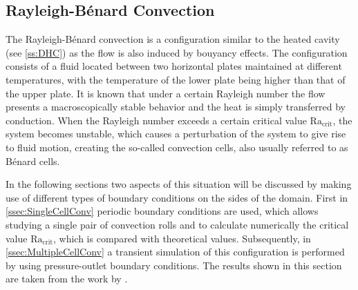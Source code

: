 \subsection{Rayleigh-Bénard Convection}\label{ssec:RayBer}

The Rayleigh-Bénard convection is a configuration similar to the heated cavity (see \cref{ss:DHC}) as the flow is also induced by bouyancy effects. The configuration consists of a fluid located between two horizontal plates maintained at different temperatures, with the temperature of the lower plate being higher than that of the upper plate. It is known that under a certain Rayleigh number the flow presents a macroscopically stable behavior and the heat is simply transferred by conduction. When the Rayleigh number exceeds a certain critical value $\text{Ra}_{\text{crit}}$, the system becomes unstable, which causes a perturbation of the system to give rise to fluid motion, creating the so-called convection cells, also usually referred to as Bénard cells.

In the following sections two aspects of this situation will be discussed by making use of different types of boundary conditions on the sides of the domain. First in \cref{ssec:SingleCellConv} periodic boundary conditions are used, which allows studying a single pair of convection rolls and to calculate numerically the critical value $\text{Ra}_{\text{crit}}$, which is compared with theoretical values. Subsequently, in \cref{ssec:MultipleCellConv} a transient simulation of this configuration is performed by using pressure-outlet boundary conditions. The results shown in this section are taken from the work by \textcite{miaoHighOrderSimulationLowMachFlows2022}.

